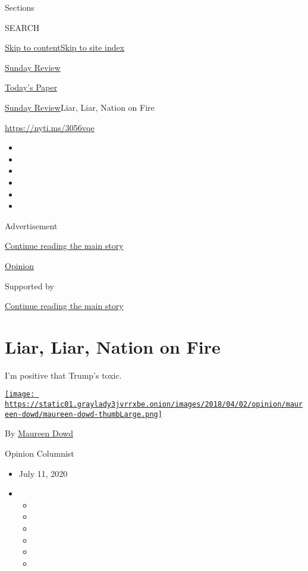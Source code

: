 Sections

SEARCH

\protect\hyperlink{site-content}{Skip to
content}\protect\hyperlink{site-index}{Skip to site index}

\href{https://www.nytimes3xbfgragh.onion/section/opinion/sunday}{Sunday
Review}

\href{https://myaccount.nytimes3xbfgragh.onion/auth/login?response_type=cookie\&client_id=vi}{}

\href{https://www.nytimes3xbfgragh.onion/section/todayspaper}{Today's
Paper}

\href{/section/opinion/sunday}{Sunday Review}\textbar{}Liar, Liar,
Nation on Fire

\url{https://nyti.ms/3056vqe}

\begin{itemize}
\item
\item
\item
\item
\item
\item
\end{itemize}

Advertisement

\protect\hyperlink{after-top}{Continue reading the main story}

\href{/section/opinion}{Opinion}

Supported by

\protect\hyperlink{after-sponsor}{Continue reading the main story}

\hypertarget{liar-liar-nation-on-fire}{%
\section{Liar, Liar, Nation on Fire}\label{liar-liar-nation-on-fire}}

I'm positive that Trump's toxic.

\href{https://www.nytimes3xbfgragh.onion/by/maureen-dowd}{\texttt{[image: https://static01.graylady3jvrrxbe.onion/images/2018/04/02/opinion/maureen-dowd/maureen-dowd-thumbLarge.png]}}

By \href{https://www.nytimes3xbfgragh.onion/by/maureen-dowd}{Maureen
Dowd}

Opinion Columnist

\begin{itemize}
\item
  July 11, 2020
\item
  \begin{itemize}
  \item
  \item
  \item
  \item
  \item
  \item
  \end{itemize}
\end{itemize}

